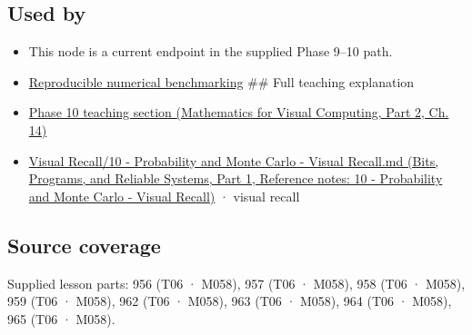 \subsection{Used by}\label{appendix-bcc44e9d3d02-used-by}

\hypertarget{appendix-bcc44e9d3d02-used-by}{}

\begin{itemize}
\item
  This node is a current endpoint in the supplied Phase 9--10 path.
\item
  \hyperref[appendix-b9db93e28371]{Reproducible numerical benchmarking} \#\# Full teaching explanation
\item
  \href{../02-Mathematics-for-Visual-Computing-P02/main.pdf\#02-foundations-ii-ch030-inference-and-error-metrics-need-explicit-assumptions}{Phase 10 teaching section (Mathematics for Visual Computing, Part 2, Ch. 14)}
\item
  \href{../01-Bits-Programs-and-Reliable-Systems-P01/main.pdf\#appendix-cb5af353ef77}{Visual Recall/10 - Probability and Monte Carlo - Visual Recall.md (Bits, Programs, and Reliable Systems, Part 1, Reference notes: 10 - Probability and Monte Carlo - Visual Recall)} · visual recall
\end{itemize}

\subsection{Source coverage}\label{appendix-bcc44e9d3d02-source-coverage}

\hypertarget{appendix-bcc44e9d3d02-source-coverage}{}

Supplied lesson parts: 956 (T06 · M058), 957 (T06 · M058), 958 (T06 · M058), 959 (T06 · M058), 962 (T06 · M058), 963 (T06 · M058), 964 (T06 · M058), 965 (T06 · M058).
